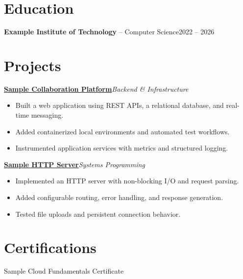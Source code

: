 \documentclass[10pt,a4paper]{article}
\newcommand{\resumeProject}[3]{%
  \href{#2}{\textbf{#1}}\hfill\textit{#3}\par\vspace{-2pt}
}
\newcommand{\resumeBulletsStart}{\begin{itemize}}
\newcommand{\resumeBulletsEnd}{\end{itemize}\vspace{2pt}}
\begin{document}
\section*{Education}
\textbf{Example Institute of Technology} -- Computer Science\hfill 2022 -- 2026

\section*{Projects}
\resumeProject{Sample Collaboration Platform}{https://example.com/project-one}{Backend \& Infrastructure}
\resumeBulletsStart
  \item Built a web application using REST APIs, a relational database, and real-time messaging.
  \item Added containerized local environments and automated test workflows.
  \item Instrumented application services with metrics and structured logging.
\resumeBulletsEnd

\resumeProject{Sample HTTP Server}{https://example.com/project-two}{Systems Programming}
\resumeBulletsStart
  \item Implemented an HTTP server with non-blocking I/O and request parsing.
  \item Added configurable routing, error handling, and response generation.
  \item Tested file uploads and persistent connection behavior.
\resumeBulletsEnd

\section*{Certifications}
Sample Cloud Fundamentals Certificate
\end{document}
